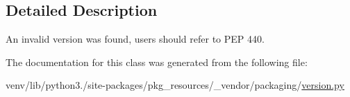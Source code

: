 \subsection{Detailed Description}
\begin{DoxyVerb}An invalid version was found, users should refer to PEP 440.
\end{DoxyVerb}
 

The documentation for this class was generated from the following file\+:\begin{DoxyCompactItemize}
\item 
venv/lib/python3./site-\/packages/pkg\+\_\+resources/\+\_\+vendor/packaging/\hyperlink{pkg__resources_2__vendor_2packaging_2version_8py}{version.\+py}\end{DoxyCompactItemize}
